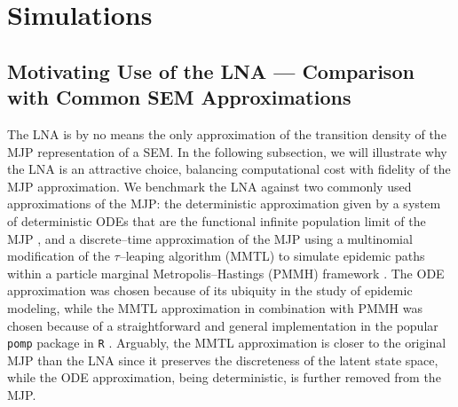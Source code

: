 \section{Simulations}
\label{sec:lna_simulations}

\subsection{Motivating Use of the LNA --- Comparison with Common SEM Approximations}
\label{subsec:lna_coverage}

The LNA is by no means the only approximation of the transition density of the MJP representation of a SEM. In the following subsection, we will illustrate why the LNA is an attractive choice, balancing computational cost with fidelity of the MJP approximation. We benchmark the LNA against two commonly used approximations of the MJP: the deterministic approximation given by a system of deterministic ODEs that are the functional infinite population limit of the MJP \cite{fuchs2013inference}, and a discrete--time approximation of the MJP using a multinomial modification of the $ \tau $--leaping algorithm (MMTL) \cite{breto2011compound} to simulate epidemic paths within a particle marginal Metropolis--Hastings (PMMH) framework \cite{andrieu2010particle}. The ODE approximation was chosen because of its ubiquity in the study of epidemic modeling, while the MMTL approximation in combination with PMMH was chosen because of a straightforward and general implementation in the popular \texttt{pomp} package in \texttt{R} \cite{pompjss}. Arguably, the MMTL approximation is closer to the original MJP than the LNA since it preserves the discreteness of the latent state space, while the ODE approximation, being deterministic, is further removed from the MJP.

